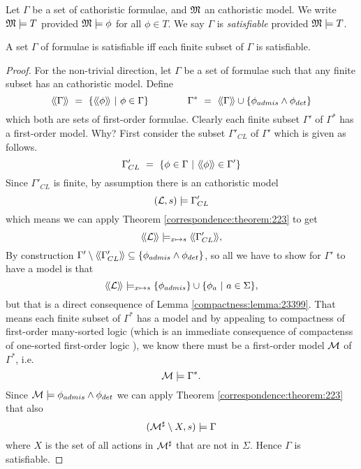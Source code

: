 \begin{definition}
Let $\Gamma$ be a set of cathoristic formulae, and $\frak{M}$ an cathoristic model.  We
write $\frak{M} \models T$ provided $\frak{M} \models \phi$ for all $\phi \in
T$.  We say $\Gamma$ is \emph{satisfiable} provided $\frak{M} \models T$.
\end{definition}

\begin{theorem}
A set $\Gamma$ of \cathoristic{} formulae is satisfiable iff each finite subset of
$\Gamma$ is satisfiable.
\end{theorem}
\begin{proof}
For the non-trivial direction, let $\Gamma$ be a set of \cathoristic{} formulae
such that any finite subset has an cathoristic model. Define 
\[
  \SEMBTWO{\Gamma} 
     \ =\ 
  \{\SEMBTWO{\phi}\ |\ \phi \in \Gamma\} 
     \qquad\qquad
  \Gamma^*
     \ =\ 
  \SEMBTWO{\Gamma} \cup \{\phi_{admis} \AND  \phi_{det}\}
\]
which both are sets of first-order formulae. Clearly each finite subset $\Gamma'$ of 
$\Gamma^*$ has a first-order model. Why? First consider the subset $\Gamma'_{CL}$ of $\Gamma'$
which is given as follows.
\[
   \Gamma'_{CL} \ =\ \{ \phi \in \Gamma\ |\ \SEMBTWO{\phi} \in \Gamma' \}
\]
Since $\Gamma'_{CL}$ is finite, by assumption there is an cathoristic model 
\[
   (\mathcal{L}, s) \models \Gamma'_{CL}
\]
which means we can apply Theorem \ref{correspondence:theorem:223} to get
\[
   \langle\!\langle \mathcal{L} \rangle\!\rangle \models_{x \mapsto s} \langle\!\langle \Gamma'_{CL} \rangle\!\rangle,
\]
By construction $\Gamma' \setminus \langle\!\langle \Gamma'_{CL} \rangle\!\rangle \subseteq
\{\phi_{admis} \land \phi_{det}\}$, so all we have to
show for $\Gamma'$ to have a model is that
\[
    \langle\!\langle \mathcal{L} \rangle\!\rangle \models_{x \mapsto s} \{\phi_{admis}\} \cup \{ \phi_a\ |\ a \in \Sigma\},
\]
but that is a direct consequence of Lemma
\ref{compactness:lemma:23399}.  That
means each finite subset of $\Gamma^*$ has a model and by appealing to
compactness of first-order many-sorted logic (which is an immediate
consequence of compactenss of one-sorted first-order logic
\cite{EndertonHB:matinttl}), we know there must be a first-order model
$\mathcal{M}$ of $\Gamma^*$, i.e.
\[
   \mathcal{M} \models \Gamma^*.
\]
Since $\mathcal{M} \models \phi_{admis} \land \phi_{det}$ we can apply
Theorem \ref{correspondence:theorem:223} that also
\[
   (\mathcal{M}^{\sharp} \setminus X, s) \models \Gamma
\]
where $X$ is the set of all actions in $\mathcal{M}^{\sharp}$ that are not
in $\Sigma$. Hence $\Gamma$ is satisfiable. 
\end{proof}





